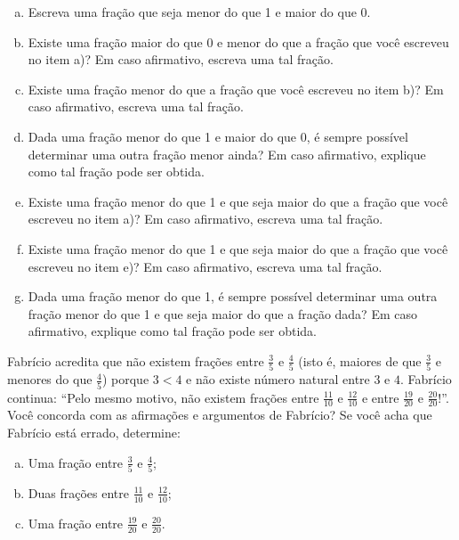 \begin{atividade}[label=chap4-ativ24]{}
\begin{enumerate}[a)]
 \item Escreva uma fração que seja menor do que 1 e maior do que 0.
 \item Existe uma fração maior do que 0 e menor do que a fração que você escreveu no item a)? Em caso afirmativo, escreva uma tal fração.
 \item Existe uma fração menor do que a fração que você escreveu no item b)? Em caso afirmativo, escreva uma tal fração.
 \item Dada uma fração menor do que 1 e maior do que 0, é sempre possível determinar uma outra fração menor ainda? Em caso afirmativo, explique como tal fração pode ser obtida.
 \item Existe uma fração menor do que 1 e que seja maior do que a fração que você escreveu no item a)? Em caso afirmativo, escreva uma tal fração.
 \item Existe uma fração menor do que 1 e que seja maior do que a fração que você escreveu no item e)? Em caso afirmativo, escreva uma tal fração.
 \item Dada uma fração menor do que 1, é sempre possível determinar uma outra fração menor do que 1 e que seja maior do que a fração dada? Em caso afirmativo, explique como tal fração pode ser obtida.
\end{enumerate}
\end{atividade}

\begin{atividade}[label=chap4-ativ24]{}

Fabrício acredita que não existem frações entre $\frac{3}{5}$ e $\frac{4}{5}$ (isto é, maiores de que $\frac{3}{5}$ e menores do que $\frac{4}{5}$) porque $3 < 4$ e não existe número natural entre $3$ e $4$. Fabrício continua: ``Pelo mesmo motivo, não existem frações entre $\frac{11}{10}$ e $\frac{12}{10}$ e entre $\frac{19}{20}$ e $\frac{20}{20}$!''. Você concorda com as afirmações e argumentos de Fabrício? Se você acha que Fabrício está errado, determine:

\begin{enumerate}[a)]
\item  Uma fração entre $\frac{3}{5}$ e $\frac{4}{5}$;

\item  Duas frações entre $\frac{11}{10}$ e $\frac{12}{10}$;

\item  Uma fração entre $\frac{19}{20}$ e $\frac{20}{20}$.
\end{enumerate}
\end{atividade}

